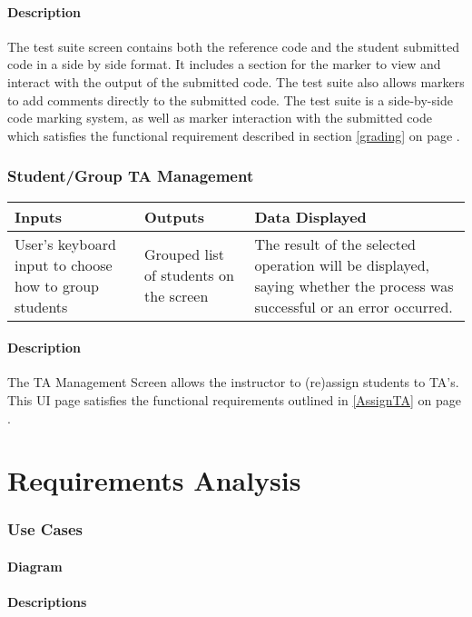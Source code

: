 \documentclass{article}
\begin{document}
\subsection{Description}
The test suite screen contains both the reference code and the student submitted
code in a side by side format.  It includes a section for the marker to view
and interact with the output of the submitted code.  The test suite also allows
markers to add comments directly to the submitted code.  The test suite is a
side-by-side code marking system, as well as marker interaction with the
submitted code which satisfies the functional requirement described in section
\ref{grading} on page \pageref{grading}.

\section{Student/Group TA Management}
\begin{tabular}{| p{5cm} | p{5cm} | p{5cm} |}
	\hline
	Inputs & Outputs & Data Displayed \\ \hline
	User's keyboard input to choose how to group students
	& Grouped list of students on the screen
	& The result of the selected operation will be displayed, saying whether
the process was successful or an error occurred.
	\\ \hline
\end{tabular}

\subsection{Description}
The TA Management Screen allows the instructor to (re)assign students to TA's.
This UI page satisfies the functional requirements outlined in \ref{AssignTA}
on page \pageref{AssignTA}.

\part{Requirements Analysis}
\section{Use Cases}
\subsection{Diagram}
\subsection{Descriptions}
\end{document}
